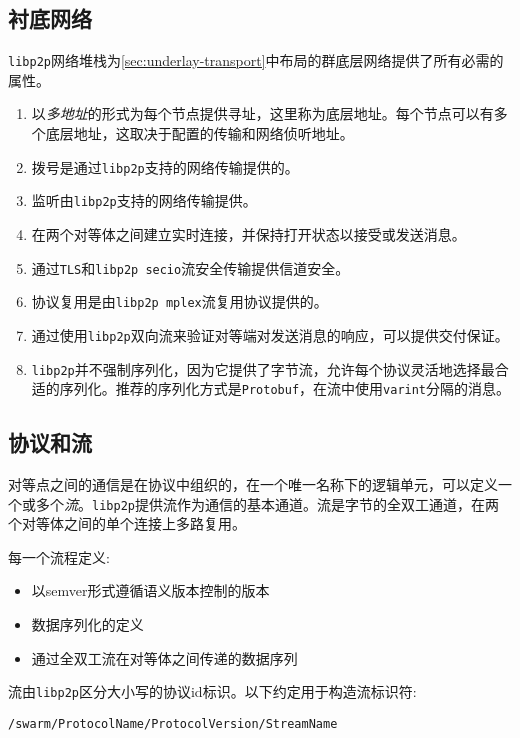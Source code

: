 
\subsection{衬底网络\statusgreen}

\lstinline{libp2p}网络堆栈为\ref{sec:underlay-transport}中布局的群底层网络提供了所有必需的属性。

\begin{enumerate}
\item 以\emph{多地址}的形式为每个节点提供寻址，这里称为底层地址。每个节点可以有多个底层地址，这取决于配置的传输和网络侦听地址。
\item 拨号是通过\lstinline{libp2p}支持的网络传输提供的。
\item 监听由\lstinline{libp2p}支持的网络传输提供。
\item 在两个对等体之间建立实时连接，并保持打开状态以接受或发送消息。
\item 通过\lstinline{TLS}和\lstinline{libp2p secio}流安全传输提供信道安全。
\item 协议复用是由\lstinline{libp2p mplex}流复用协议提供的。
\item 通过使用\lstinline{libp2p}双向流来验证对等端对发送消息的响应，可以提供交付保证。
\item \lstinline{libp2p}并不强制序列化，因为它提供了字节流，允许每个协议灵活地选择最合适的序列化。推荐的序列化方式是\lstinline{Protobuf}，在流中使用\lstinline{varint}分隔的消息。
\end{enumerate}

\subsection{协议和流\statusgreen}

对等点之间的通信是在协议中组织的，在一个唯一名称下的逻辑单元，可以定义一个或多个\emph{流}。\lstinline{libp2p}提供流作为通信的基本通道。流是字节的全双工通道，在两个对等体之间的单个连接上多路复用。

每一个流程定义:

\begin{itemize}
\item 以semver形式遵循语义版本控制的版本
\item 数据序列化的定义
\item 通过全双工流在对等体之间传递的数据序列
\end{itemize}

流由\lstinline{libp2p}区分大小写的协议id标识。以下约定用于构造流标识符:

\begin{lstlisting}
/swarm/ProtocolName/ProtocolVersion/StreamName
\end{lstlisting}

